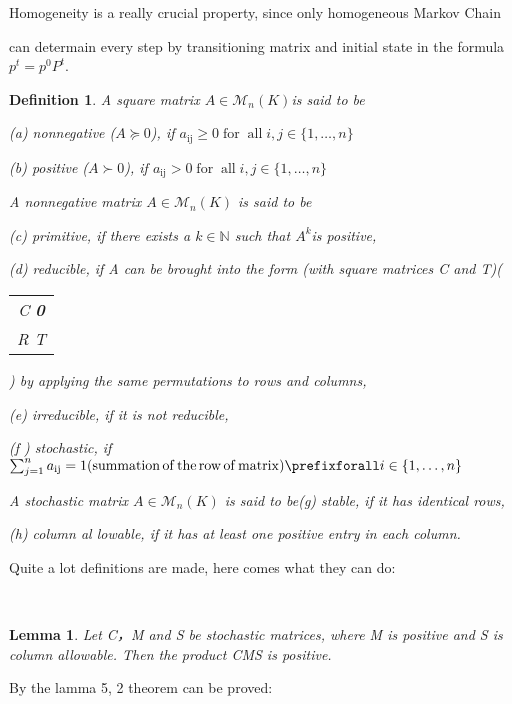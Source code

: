 \documentclass{article}
\newcommand{\tmem}[1]{{\em #1\/}}
\newcommand{\tmop}[1]{\ensuremath{\operatorname{#1}}}
\newcommand{\tmstrong}[1]{\textbf{#1}}
\newtheorem{definition}{Definition}
{\theorembodyfont{\rmfamily}\newtheorem{example}{Example}}
\newtheorem{lemma}{Lemma}
{\theorembodyfont{\rmfamily}\newtheorem{note}{Note}}
{\theorembodyfont{\rmfamily}\newtheorem{remark}{Remark}}
\begin{document}
\begin{remark}
  Homogeneity is a really crucial property, since only homogeneous Markov
  Chain
  
  can determain every step by transitioning matrix and initial state in the
  formula $p^t = p^0 P^t$.
\end{remark}

\begin{definition}
  A square matrix $A \in \mathcal{M}_n (K) $is said to be
  
  (a) nonnegative ($A \succcurlyeq 0$), if $a_{\tmop{ij}} \geqslant 0
  \tmop{for} \tmop{all} i, j \in \{ 1, \ldots, n \}$
  
  (b) positive ($A \succ 0$), if $a_{\tmop{ij}} > 0 \tmop{for} \tmop{all} i, j
  \in \{ 1, \ldots, n \}$
  
  A nonnegative matrix $A \in \mathcal{M}_n (K)$ is said to be
  
  (c) primitive, if there exists a $k \in \mathbb{N}$ such that $A ^k $is
  positive,
  
  (d) reducible, if A can be brought into the form (with square matrices C and
  T)\left(\begin{tabular}{c}
    C {\tmstrong{{\tmem{0{\tmstrong{}}}}}}\\
    R T
  \end{tabular}\right) by applying the same permutations to rows and columns,
  
  (e) irreducible, if it is not reducible,
  
  (f ) stochastic, if $\sum_{j = 1}^n a_{\tmop{ij}} = 1 (\tmop{summation}
  \tmop{of} \tmop{the} \tmop{row} \tmop{of} \tmop{matrix})  \prefixforall i
  \in \{ 1, \ldots, n \}$
  
  A stochastic matrix $A \in \mathcal{M}_n (K)$ is said to be(g) stable, if it
  has identical rows,
  
  (h) column al lowable, if it has at least one positive entry in each column.
\end{definition}

Quite a lot definitions are made, here comes what they can do:

\

\begin{lemma}
  Let C，M and S be stochastic matrices, where M is positive and S is column
  allowable. Then the product CMS is positive.
\end{lemma}

By the lamma 5, 2 theorem can be proved:
\end{document}
